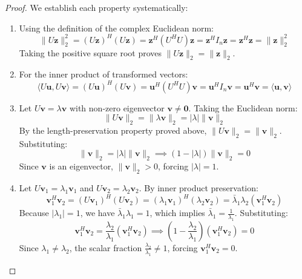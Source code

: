 \begin{proof}
We establish each property systematically:
\begin{enumerate}
    \item Using the definition of the complex Euclidean norm:
    \begin{equation}
    \|U\mathbf{z}\|_2^2 = (U\mathbf{z})^H (U\mathbf{z}) = \mathbf{z}^H (U^H U) \mathbf{z} = \mathbf{z}^H I_n \mathbf{z} = \mathbf{z}^H \mathbf{z} = \|\mathbf{z}\|_2^2
    \end{equation}
    Taking the positive square root proves $\|U\mathbf{z}\|_2 = \|\mathbf{z}\|_2$.
    \item For the inner product of transformed vectors:
    \begin{equation}
    \langle U\mathbf{u}, U\mathbf{v} \rangle = (U\mathbf{u})^H (U\mathbf{v}) = \mathbf{u}^H (U^H U) \mathbf{v} = \mathbf{u}^H I_n \mathbf{v} = \mathbf{u}^H \mathbf{v} = \langle \mathbf{u}, \mathbf{v} \rangle
    \end{equation}
    \item Let $U\mathbf{v} = \lambda \mathbf{v}$ with non-zero eigenvector $\mathbf{v} \ne \mathbf{0}$. Taking the Euclidean norm:
    \begin{equation}
    \|U\mathbf{v}\|_2 = \|\lambda \mathbf{v}\|_2 = |\lambda| \|\mathbf{v}\|_2
    \end{equation}
    By the length-preservation property proved above, $\|U\mathbf{v}\|_2 = \|\mathbf{v}\|_2$. Substituting:
    \begin{equation}
    \|\mathbf{v}\|_2 = |\lambda| \|\mathbf{v}\|_2 \implies (1 - |\lambda|)\|\mathbf{v}\|_2 = 0
    \end{equation}
    Since $\mathbf{v}$ is an eigenvector, $\|\mathbf{v}\|_2 > 0$, forcing $|\lambda| = 1$.
    \item Let $U\mathbf{v}_1 = \lambda_1 \mathbf{v}_1$ and $U\mathbf{v}_2 = \lambda_2 \mathbf{v}_2$. By inner product preservation:
    \begin{equation}
    \mathbf{v}_1^H \mathbf{v}_2 = (U\mathbf{v}_1)^H (U\mathbf{v}_2) = (\lambda_1 \mathbf{v}_1)^H (\lambda_2 \mathbf{v}_2) = \bar{\lambda}_1 \lambda_2 (\mathbf{v}_1^H \mathbf{v}_2)
    \end{equation}
    Because $|\lambda_1| = 1$, we have $\bar{\lambda}_1 \lambda_1 = 1$, which implies $\bar{\lambda}_1 = \frac{1}{\lambda_1}$. Substituting:
    \begin{equation}
    \mathbf{v}_1^H \mathbf{v}_2 = \frac{\lambda_2}{\lambda_1}(\mathbf{v}_1^H \mathbf{v}_2) \implies \left(1 - \frac{\lambda_2}{\lambda_1}\right)(\mathbf{v}_1^H \mathbf{v}_2) = 0
    \end{equation}
    Since $\lambda_1 \ne \lambda_2$, the scalar fraction $\frac{\lambda_2}{\lambda_1} \ne 1$, forcing $\mathbf{v}_1^H \mathbf{v}_2 = 0$.
\end{enumerate}
\end{proof}

